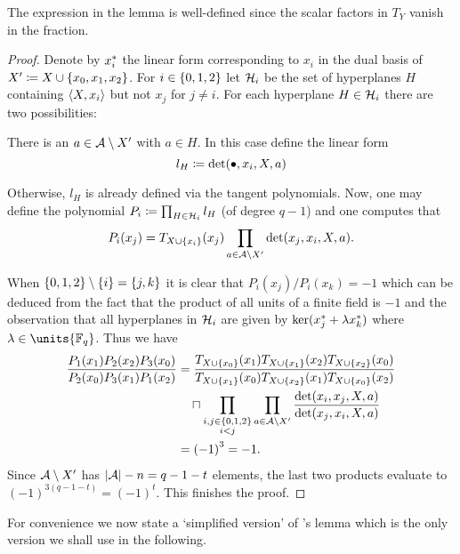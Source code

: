 \begin{remark}
    The expression in the lemma is well-defined since the scalar factors in $T_Y$ vanish in the fraction.
\end{remark}

\begin{proof}
    Denote by ${x}^{\ast}_i$ the linear form corresponding to $x_i$ in the dual basis of $X'\defeq X\setjoin\set{x_0,x_1,x_2}$.
    For $i\in\set{0,1,2}$ let $\mathcal{H}_i$ be the set of hyperplanes $H$ containing $\gen{X,x_i}$ but not $x_j$ for $j\neq i$.
    For each hyperplane $H\in \mathcal{H}_i$ there are two possibilities:
    \begin{casebycase}
        \item There is an $a\in\mathcal{A}\setminus X'$ with $a\in H$. In this case define the linear form
    $$
    l_H\mathrel{\mathrel{\mathop:}\mkern-1.2mu=} \det(\bullet,x_i,X,a)
    $$
        \item Otherwise, $l_H$ is already defined via the tangent polynomials.
    Now, one may define the polynomial $P_i\mathrel{\mathrel{\mathop:}\mkern-1.2mu=} \prod_{H\in \mathcal{H}_i}{l_H}$ (of degree $q-1$) and one computes that
    $$
    P_i(x_j)=T_{X\setjoin\set{x_i}}(x_j)\prod_{a\in\cA\setminus X'}{\det(x_j,x_i,X,a)}.
    $$%
    \end{casebycase}
    When $\set{0,1,2}\setminus\set{i}=\set{j,k}$ it is clear that $P_i(x_j)/P_i(x_k)=-1$ which can be deduced from the fact that the product of all units of a finite field is $-1$ and the observation that all hyperplanes in $\mathcal{H}_i$ are given by $\ker({x}^{\ast}_j+\lambda {x}^{\ast}_k)$ where $\lambda\in\units{\field{q}}$.
    Thus we have
    \begin{align*}
        \frac{P_1(x_1)P_2(x_2)P_3(x_0)}{P_2(x_0)P_3(x_1)P_1(x_2)} &= \frac{T_{X\setjoin\set{x_0}}(x_1)T_{X\setjoin\set{x_1}}(x_2)T_{X\setjoin\set{x_2}}(x_0)}{T_{X\setjoin\set{x_1}}(x_0)T_{X\setjoin\set{x_2}}(x_1)T_{X\setjoin\set{x_0}}(x_2)}\\
        & \quad\setprod\prod_{\substack{i,j\in\set{0,1,2}\\ i<j}}\prod_{a\in\cA\setminus X'}{\frac{\det(x_i,x_j,X,a)}{\det(x_j,x_i,X,a)}}\\
        & = {(-1)}^3=-1.
    \end{align*}
    Since $\mathcal{A}\setminus X'$ has $\left\vert{\mathcal{A}}\right\vert-n=q-1-t$ elements, the last two products evaluate to ${(-1)}^{3(q-1-t)}={(-1)}^t$.
    This finishes the proof.
\end{proof}

For convenience we now state a `simplified version' of 's lemma which is the only version we shall use in the following.

